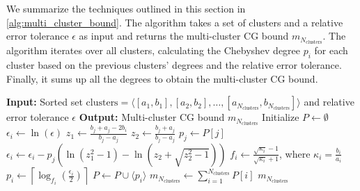 We summarize the techniques outlined in this section in \cref{alg:multi_cluster_bound}. The algorithm takes a set of clusters and a relative error tolerance $\epsilon$ as input and returns the multi-cluster CG bound $m_{N_{\text{clusters}}}$. The algorithm iterates over all clusters, calculating the Chebyshev degree $p_i$ for each cluster based on the previous clusters' degrees and the relative error tolerance. Finally, it sums up all the degrees to obtain the multi-cluster CG bound.
\begin{algorithm}[H]
    \caption{$\operatorname{MultiClusterCGIterationBound}(\text{clusters}, \epsilon)$}
    \begin{algorithmic}[1]
        \State \textbf{Input:} Sorted set $\text{clusters} = \langle[a_1, b_1], [a_2, b_2], \ldots, [a_{N_{\text{clusters}}}, b_{N_{\text{clusters}}}]\rangle$ and relative error tolerance $\epsilon$
        \State \textbf{Output:} Multi-cluster CG bound $m_{N_{\text{clusters}}}$
        \State Initialize $P \gets \emptyset$
            \State $\epsilon_i \gets \ln(\epsilon)$
             
                \State $z_1 \gets \frac{b_j + a_j - 2b_i}{b_j - a_j}$
                \State $z_2 \gets \frac{b_j + a_j}{b_j - a_j}$
                \State $p_j \gets P[j]$
                \State $\epsilon_i \gets \epsilon_i - p_j \left(\ln(z_1^2 -1) - \ln\left(z_2 + \sqrt{z_2^2 -1}\right)\right)$
            \EndFor
            \State $f_i \gets \frac{\sqrt{\kappa_i} - 1}{\sqrt{\kappa_i} + 1}$, where $\kappa_i = \frac{b_i}{a_i}$
            \State $p_i \gets \left\lceil\log_{f_i}\left(\frac{\epsilon_i}{2}\right)\right\rceil$
            \State $P \gets P \cup \langle p_i \rangle$
        \EndFor
        \State $m_{N_{\text{clusters}}} \gets \sum_{i=1}^{N_{\text{clusters}}} P[i]$
        \State \Return $m_{N_{\text{clusters}}}$
    \end{algorithmic}
    \label{alg:multi_cluster_bound}
\end{algorithm}


